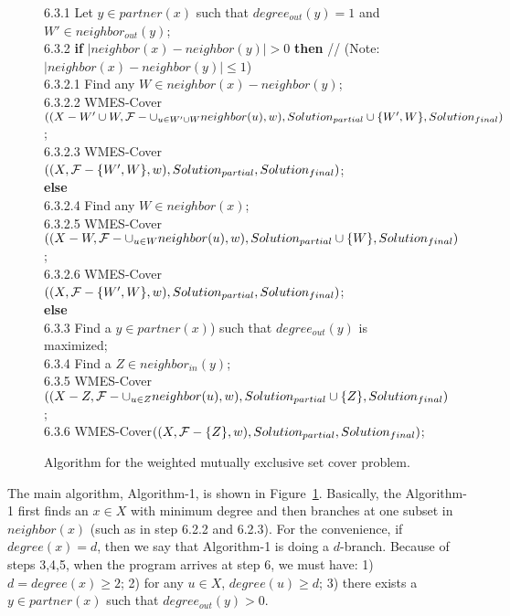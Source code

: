 \documentclass[11pt]{article}
\begin{document}
\begin{figure}[htb]
\begin{tabbing}
6.3.1 \>\>\> Let $y\in partner(x)$ such that $degree_{out}(y)=1$ and $W'\in neighbor_{out}(y)$; \\
6.3.2 \>\>\> {\bf if} $| neighbor(x)-neighbor(y)|>0$ {\bf then} //
(Note: $|
neighbor(x)-neighbor(y)|\leq 1$) \\
6.3.2.1 \>\>\>\> Find any $W \in neighbor(x)-neighbor(y)$;\\
6.3.2.2 \>\>\>\> WMES-Cover$((X-W'\cup W,{\cal F}-\cup_{u \in
W'\cup W}neighbor(u),w),Solution_{partial}\cup
\{W',W\}, Solution_{final})$;\\
6.3.2.3 \>\>\>\> WMES-Cover$((X,{\cal F}-\{W',W\},w),Solution_{partial}, Solution_{final})$;\\
\>\>\> {\bf else}\\
6.3.2.4 \>\>\>\> Find any $W \in neighbor(x)$;\\
6.3.2.5 \>\>\>\> WMES-Cover$((X-W,{\cal F}-\cup_{u \in
W}neighbor(u),w),Solution_{partial}\cup
\{W\}, Solution_{final})$;\\
6.3.2.6 \>\>\>\> WMES-Cover$((X,{\cal F}-\{W',W\},w),Solution_{partial}, Solution_{final})$;\\


\>\> {\bf else}\\

6.3.3 \>\>\> Find a $y \in
partner(x)$) such that $degree_{out}(y)$ is maximized;\\
6.3.4 \>\>\> Find a $Z\in neighbor_{in}(y)$; \\
6.3.5 \>\>\> WMES-Cover$((X-Z,{\cal F}-\cup_{u \in
Z}neighbor(u),w),Solution_{partial}\cup
\{Z\}, Solution_{final})$;\\
6.3.6 \>\>\> WMES-Cover$((X,{\cal F}-\{Z\},w),Solution_{partial}, Solution_{final})$;\\
\end{tabbing}
\vspace*{-3mm}
\caption{Algorithm for the {\sc weighted mutually exclusive set
cover} problem.} \label{Algorithm_main}
\end{figure}


The main algorithm, Algorithm-1, is shown in
Figure~\ref{Algorithm_main}. Basically, the Algorithm-1 first
finds an $x \in X$ with minimum degree and then branches at one
subset in $neighbor(x)$ (such as in step 6.2.2 and 6.2.3). For the
convenience, if $degree(x)=d$, then we say that Algorithm-1 is
doing a $d$-branch. Because of steps 3,4,5, when the program
arrives at step 6, we must have: 1) $d=degree(x)\geq 2$; 2) for
any $u \in X$, $degree(u) \geq d$; 3) there exists a $y\in
partner(x)$ such that $degree_{out}(y)>0$.
\end{document}
